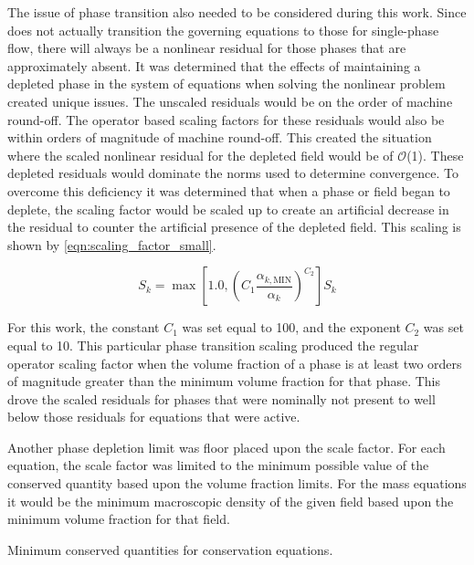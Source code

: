 The issue of phase transition also needed to be considered during this work.
Since \cobra{} does not actually transition the governing equations to those for single-phase flow, there will always be a nonlinear residual for those phases that are approximately absent.
It was determined that the effects of maintaining a depleted phase in the system of equations when solving the nonlinear problem created unique issues.
The unscaled residuals would be on the order of machine round-off.
The operator based scaling factors for these residuals would also be within orders of magnitude of machine round-off.
This created the situation where the scaled nonlinear residual for the depleted field would be of $\mathcal{O}$(1).
These depleted residuals would dominate the norms used to determine convergence.
To overcome this deficiency it was determined that when a phase or field began to deplete, the scaling factor would be scaled up to create an artificial decrease in the residual to counter the artificial presence of the depleted field.
This scaling is shown by \eqref{eqn:scaling_factor_small}.

\begin{equation}
\label{eqn:scaling_factor_small}
S_k = \max[1.0, \left(C_1 \frac{\alpha_{k,\text{MIN}}}{\alpha_k}\right)^{C_2} ] S_k
\end{equation}

For this work, the constant $C_1$ was set equal to 100, and the exponent $C_2$ was set equal to 10.
This particular phase transition scaling produced the regular operator scaling factor when the volume fraction of a phase is at least two orders of magnitude greater than the minimum volume fraction for that phase.
This drove the scaled residuals for phases that were nominally not present to well below those residuals for equations that were active.

Another phase depletion limit was floor placed upon the scale factor.
For each equation, the scale factor was limited to the minimum possible value of the conserved quantity based upon the volume fraction limits.
For the mass equations it would be the minimum macroscopic density of the given field based upon the minimum volume fraction for that field.


\begin{table}[ht]
\centering

\caption{Minimum conserved quantities for conservation equations.}
\label{tab:minimumConservedValues}
\end{table}

